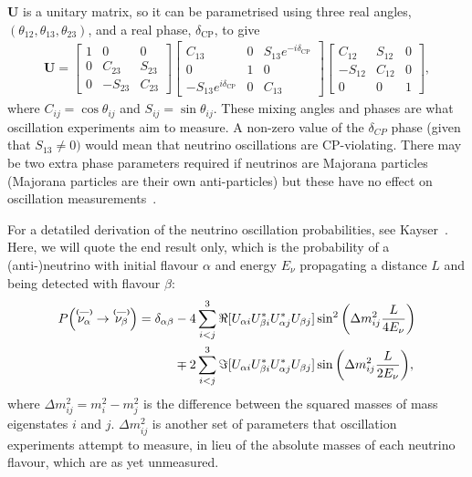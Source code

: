\documentclass[aps,pra,12pt,notitlepage,tightenlines]{revtex4-1}
\newcommand\matr[1]{\bm{#1}}
\newcommand\barparen[1]{\overset{\textbf{\fontsize{5pt}{5pt}\selectfont(---)}}{#1}}
\begin{document}
$\matr{U}$ is a unitary matrix, so it can be parametrised using three real angles, $(\theta_{12}, \theta_{13}, \theta_{23})$, and a real phase, $\delta_\mathrm{CP}$, to give
\begin{gather}
 \matr{U} = 
 \begin{bmatrix}
 1 & 0 & 0 \\
 0 & C_{23} & S_{23} \\
 0 & -S_{23} & C_{23}
 \end{bmatrix}
 \begin{bmatrix}
 C_{13} & 0 & S_{13}e^{-i\delta_\mathrm{CP}} \\
 0 & 1 & 0 \\
 -S_{13}e^{i\delta_\mathrm{CP}} & 0 & C_{13}
 \end{bmatrix}
 \begin{bmatrix}
 C_{12} & S_{12} & 0 \\
 -S_{12} & C_{12} & 0 \\
 0 & 0 & 1
 \end{bmatrix}
 ,
\end{gather}
where $C_{ij} = \cos\theta_{ij}$ and $S_{ij} = \sin\theta_{ij}$. These mixing angles and phases are what oscillation experiments aim to measure. A non-zero value of the $\delta_{CP}$ phase (given that $S_{13}\neq 0)$ would mean that neutrino oscillations are CP-violating. There may be two extra phase parameters required if neutrinos are Majorana particles (Majorana particles are their own anti-particles) but these have no effect on oscillation measurements~\cite{Kayser:2005cd}.

For a detatiled derivation of the neutrino oscillation probabilities, see Kayser~\cite{Kayser:2011jn}. Here, we will quote the end result only, which is the probability of a \mbox{(anti-)neutrino} with initial flavour $\alpha$ and energy $E_\nu$ propagating a distance $L$ and being detected with flavour $\beta$:
\begin{align}
\label{eq:p}
P\Big(\barparen{\nu_\alpha}\rightarrow\barparen{\nu_\beta}\Big) = \delta_{\alpha\beta}&-4\sum^3_{i<j}\Re[U_{\alpha i}U_{\beta i}^*U_{\alpha j}^*U_{\beta j}]\sin^2\bigg(\Delta m^2_{ij}\frac{L}{4E_\nu}\bigg) \notag \\
& \mp 2\sum^3_{i<j}\Im[U_{\alpha i}U_{\beta i}^*U_{\alpha j}^*U_{\beta j}]\sin\bigg(\Delta m^2_{ij}\frac{L}{2E_\nu}\bigg),
\end{align}
where $\Delta m^2_{ij} = m^2_i - m^2_j$ is the difference between the squared masses of mass eigenstates $i$ and $j$. $\Delta m^2_{ij}$ is another set of parameters that oscillation experiments attempt to measure, in lieu of the absolute masses of each neutrino flavour, which are as yet unmeasured.
\end{document}
